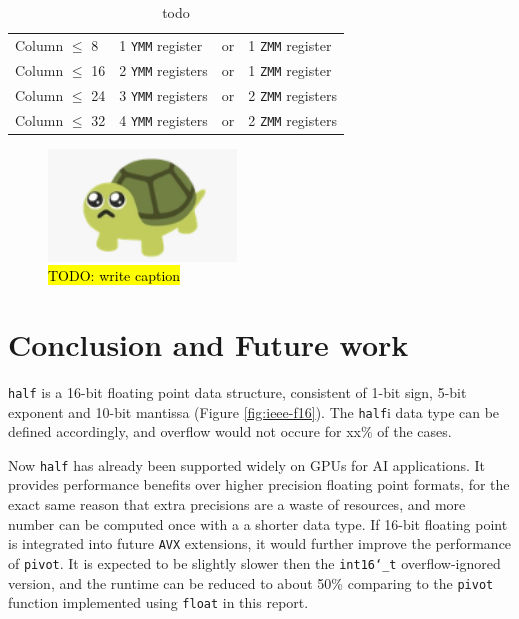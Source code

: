 \documentclass[logo,bsc,singlespacing,parskip]{infthesis}
\newcommand{\dtshort}{\texttt{int16\char`_t}}
\newcommand{\dthalf}{\texttt{half}}
\newcommand{\dtfloat}{\texttt{float}}
\newcommand{\pivot}{\texttt{pivot}}
\newcommand{\ymm}{\texttt{YMM}}
\newcommand{\zmm}{\texttt{ZMM}}
\begin{document}
\begin{table}[H]
\centering
\captionsetup{justification=centering}
\begin{tabular}{llll}
    Column $\leq$ 8  & 1 \ymm{} register  & or &  1 \zmm{} register   \\
    Column $\leq$ 16 & 2 \ymm{} registers & or & 1 \zmm{} register   \\
    Column $\leq$ 24 & 3 \ymm{} registers & or & 2 \zmm{} registers   \\
    Column $\leq$ 32 & 4 \ymm{} registers & or & 2 \zmm{} registers  
    \end{tabular}
\caption{todo}
\label{table:specialization}
\end{table}

\begin{figure}[H]
    \begin{center}
        \includegraphics[width=50mm]{image/turtle.png}
    \end{center}
    \caption{\hl{TODO: write caption}}
    \label{fig:specialization}
\end{figure}

\chapter{Conclusion and Future work}

\dthalf{} is a 16-bit floating point data structure, consistent of 1-bit sign,
5-bit exponent and 10-bit mantissa (Figure \ref{fig:ieee-f16}). The \dthalf{}i{}
data type can be defined accordingly, and overflow would not occure for xx\% of
the cases. 

Now \dthalf{} has already been supported widely on GPUs for AI applications. It
provides performance benefits over higher precision floating point formats, for
the exact same reason that extra precisions are a waste of resources, and more
number can be computed once with a a shorter data type. If 16-bit floating point
is integrated into future \texttt{AVX} extensions, it would further improve the
performance of \pivot{}. It is expected to be slightly slower then the \dtshort{}
overflow-ignored version, and the runtime can be reduced to about 50\% comparing
to the \pivot{} function implemented using \dtfloat{} in this report.
\end{document}

